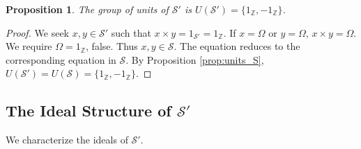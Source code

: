 \documentclass[11pt, a4paper]{article}
\theoremstyle{plain}
\newtheorem{proposition}[theorem]{Proposition}
\theoremstyle{definition}
\numberwithin{equation}{section}
\newcommand{\Z}{\mathbb{Z}}
\newcommand{\OmegaObj}{\Omega} %
\newcommand{\SemiringS}{\mathcal{S}}
\newcommand{\SemiringSPrime}{\mathcal{S}'}
\begin{document}
\begin{proposition}\label{prop:units_SPrime}
The group of units of $\SemiringSPrime$ is $U(\SemiringSPrime) = \{1_{\Z}, -1_{\Z}\}$.
\end{proposition}
\begin{proof}
We seek $x, y \in \SemiringSPrime$ such that $x\times y = 1_{\SemiringSPrime} = 1_{\Z}$.
If $x=\OmegaObj$ or $y=\OmegaObj$, $x\times y = \OmegaObj$. We require $\OmegaObj=1_{\Z}$, false.
Thus $x, y \in \SemiringS$. The equation reduces to the corresponding equation in $\SemiringS$. By Proposition \ref{prop:units_S}, $U(\SemiringSPrime)=U(\SemiringS) = \{1_{\Z}, -1_{\Z}\}$.
\end{proof}

\subsection{The Ideal Structure of $\SemiringSPrime$}

We characterize the ideals of $\SemiringSPrime$.
\end{document}
